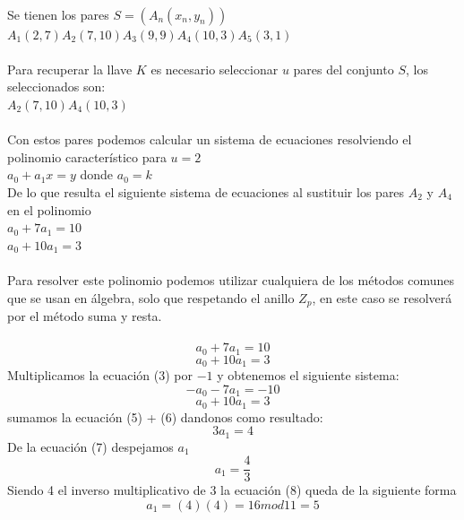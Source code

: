 \documentclass[12pt,oneside,onecolumn,openany]{report}
\begin{document}
\\
Se tienen los pares $S=(A_n(x_n,y_n))$\\
$A_1(2,7)$\hspace{1cm}$A_2(7,10)$\hspace{1cm}$A_3(9,9)$\hspace{1cm}$A_4(10,3)$\hspace{1cm}$A_5(3,1)$\\
\\
Para recuperar la llave $K$ es necesario seleccionar $u$ pares del conjunto $S$, los seleccionados son:\\
$A_2(7,10)$\hspace{1cm}$A_4(10,3)$\\
\\
Con estos pares podemos calcular un sistema de ecuaciones resolviendo el polinomio característico para $u=2$\\
$a_0+a_1x=y$ donde $a_0=k$\\
De lo que resulta el siguiente sistema de ecuaciones al sustituir los pares $A_2$ y $A_4$ en el polinomio\\
$a_0+7a_1=10$\\
$a_0+10a_1=3$\\
\\
Para resolver este polinomio podemos utilizar cualquiera de los métodos comunes que se usan en álgebra, solo que respetando el anillo $Z_p$, en este caso se resolverá por el método suma y resta.\\
\\
\begin{equation}
 a_0+7a_1=10
\end{equation}
\begin{equation}
 a_0+10a_1=3
\end{equation}
Multiplicamos la ecuación (3) por $-1$ y obtenemos el siguiente sistema:
\begin{equation}
 -a_0-7a_1=-10
\end{equation}
\begin{equation}
 a_0+10a_1=3
\end{equation}
sumamos la ecuación (5) + (6) dandonos como resultado:
\begin{equation}
 3a_1=4
\end{equation}
De la ecuación (7) despejamos $a_1$
\begin{equation}
 a_1=\frac{4}{3}
\end{equation}
Siendo 4 el inverso multiplicativo de 3 la ecuación (8) queda de la siguiente forma
\begin{equation}
 a_1=(4)(4)=16 mod11 =5
\end{equation}
\end{document}
